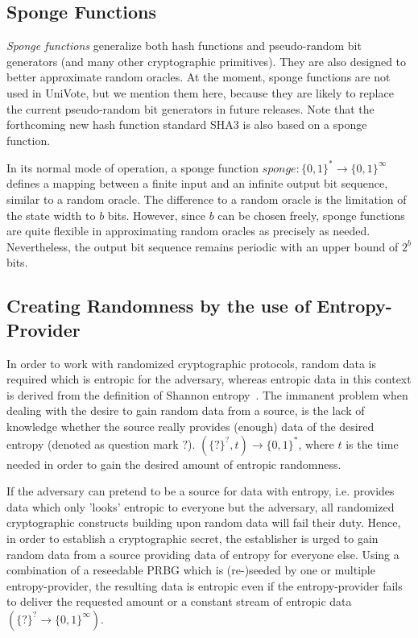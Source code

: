 \documentclass[bibtotoc,halfparskip,oneside]{scrreprt}
\begin{document}
	
	\subsection{Sponge Functions}
	
	\emph{Sponge functions} generalize both hash functions and pseudo-random bit generators (and many other cryptographic primitives). They are also designed to better approximate random oracles. At the moment, sponge functions are not used in UniVote, but we mention them here, because they are likely to replace the current pseudo-random bit generators in future releases. Note that the forthcoming new hash function standard SHA3 is also based on a sponge function.
	
	In its normal mode of operation, a sponge function $\mathit{sponge}:\{0,1\}^*\rightarrow\{0,1\}^\infty$ defines a mapping between a finite input and an infinite output bit sequence, similar to a random oracle. The difference to a random oracle is the limitation of the state width to $b$ bits. However, since $b$ can be chosen freely, sponge functions are quite flexible in approximating random oracles as precisely as needed. Nevertheless, the output bit sequence remains periodic with an upper bound of $2^b$ bits.
	
	
	
	\subsection{Creating Randomness by the use of Entropy-Provider}
	In order to work with randomized cryptographic protocols, random data is required which is entropic for the adversary, whereas entropic data in this context is derived from the definition of Shannon entropy~\cite{shannon48}. The immanent problem when dealing with the desire to gain random data from a source, is the lack of knowledge whether the source really provides (enough) data of the desired entropy (denoted as question mark $?$). $(\{?\}^?,t) \rightarrow \{0,1\}^*$, where $t$ is the time needed in order to gain the desired amount of entropic randomness.
	
	If the adversary can pretend to be a source for data with entropy, i.e. provides data which only 'looks' entropic to everyone but the adversary, all randomized cryptographic constructs building upon random data will fail their duty. Hence, in order to establish a cryptographic secret, the establisher is urged to gain random data from a source providing data of entropy for everyone else. Using a combination of a reseedable PRBG which is (re-)seeded by one or multiple entropy-provider, the resulting data is entropic even if the entropy-provider fails to deliver the requested amount or a constant stream of entropic data $(\{?\}^?\rightarrow\{0,1\}^\infty)$.
	
\end{document}
